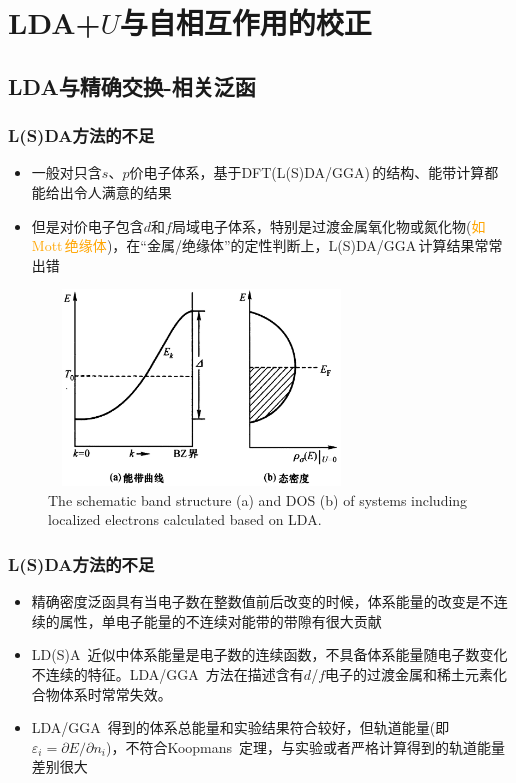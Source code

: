 \documentclass[cjk,slidestop,compress,mathserif,blue]{beamer}
\newcommand{\upcite}[1]{\hspace{0ex}\textsuperscript{\cite{#1}}} %
\begin{document}
\section{\rm{LDA+}$U$与自相互作用的校正}
\subsection{\rm{LDA}与精确交换-相关泛函}
\frame
{
	\frametitle{\textrm{L(S)DA}方法的不足}
	\begin{itemize}
		\item 一般对只含$s$、$p$价电子体系，基于\textrm{DFT(L(S)DA/GGA)\,}的结构、能带计算都能给出令人满意的结果
		\item 但是对价电子包含$d$和$f$局域电子体系，特别是过渡金属氧化物或氮化物(\textcolor{orange}{如\textrm{Mott}\,绝缘体})，在“金属/绝缘体”的定性判断上，\textrm{L(S)DA/GGA}\,计算结果常常出错
	\end{itemize}
\begin{figure}[h!]
\centering
\vspace*{-0.35in}
\includegraphics[height=2.05in,width=3.2in,viewport=0 0 1200 880,clip]{Figures/LDA_U-3.png}
\caption{\tiny \textrm{The schematic band structure (a) and DOS (b) of systems including localized electrons calculated based on LDA.}}%
\label{LDA_U-3}
\end{figure}
}

\frame
{
	\frametitle{\textrm{L(S)DA}方法的不足}
\begin{itemize}
\setlength{\itemsep}{12pt}
	\item 精确密度泛函具有当电子数在整数值前后改变的时候，体系能量的改变是不连续的属性，单电子能量的不连续对能带的带隙有很大贡献
	 \item\textrm{LD(S)A~}近似中体系能量是电子数的连续函数，不具备体系能量随电子数变化不连续的特征。\textrm{LDA/GGA~}方法在描述含有$d$/$f$电子的过渡金属和稀土元素化合物体系时常常失效。
	\item \textrm{LDA}/\textrm{GGA~}得到的体系总能量和实验结果符合较好，但轨道能量(即$\varepsilon_i=\partial E/\partial n_i$)，不符合\textrm{Koopmans~}定理，与实验或者严格计算得到的轨道能量差别很大%
\end{itemize}
}
\end{document}
